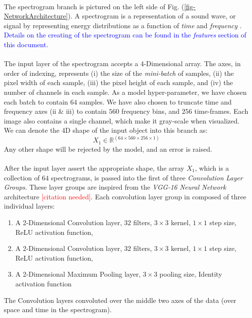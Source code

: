 \documentclass[12pt,letterpaper]{article}
\begin{document}
\paragraph*{}The spectrogram branch is pictured on the left side of Fig. (\ref{fig-NetworkArchitecture}). A spectrogram is a representation of a sound wave, or signal by representing energy distributions as a function of \textit{time} and \textit{frequency} \cite{White,Olsen,Kahn}. \textcolor{blue}{Details on the creating of the spectrogram can be found in the \textit{features} section of this document.}

\paragraph*{}The input layer of the spectrogram accepts a 4-Dimensional array. The axes, in order of indexing, represents (i) the size of the \textit{mini-batch} of samples, (ii) the pixel width of each sample, (iii) the pixel height of each sample, and (iv) the number of channels in each sample. As a model hyper-parameter, we have chosen each batch to contain $64$ samples. We have also chosen to truncate time and frequency axes (ii \& iii) to contain $560$ frequency bins, and $256$ time-frames. Each image also contains a single channel, which make it gray-scale when visualized. We can denote the 4D shape of the input object into this branch as:
\begin{equation}
\label{eqn-shapeX1}
X_1 \in \mathbb{R}^{(64 \times 560 \times 256 \times 1)}
\end{equation}
Any other shape will be rejected by the model, and an error is raised.

\paragraph*{}After the input layer assert the appropriate shape, the array $X_1$, which is a collection of $64$ spectrograms, is passed into the first of three \textit{Convolution Layer Groups}. These layer groups are inspired from the \textit{VGG-16 Neural Network} architecture \textcolor{red}{[citation needed]}. Each convolution layer group in composed of three individual layers: 
\begin{enumerate}
\item A 2-Dimensional Convolution layer, $32$ filters, $3 \times 3$ kernel, $1 \times 1$ step size, ReLU activation function,
\item A 2-Dimensional Convolution layer, $32$ filters, $3 \times 3$ kernel, $1 \times 1$ step size, ReLU activation function,
\item A 2-Dimensional Maximum Pooling layer, $3 \times 3$ pooling size, Identity activation function
\end{enumerate}  
The Convolution layers convoluted over the middle two axes of the data (over space and time in the spectrogram). 
\end{document}
